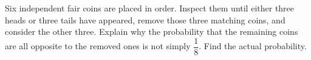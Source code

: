 Six independent fair coins are placed in order. Inspect them until either three heads or three tails have appeared, remove those three matching coins, and consider the other three. Explain why the probability that the remaining coins are all opposite to the removed ones is not simply $\dfrac{1}{8}$. Find the actual probability.
